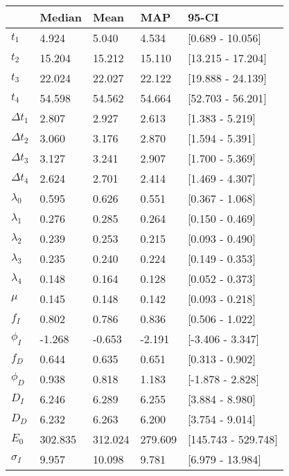 \begin{tabular}{lllll}
\toprule
{} &   Median &     Mean &      MAP &                95-CI \\
\midrule
$t_1$        &    4.924 &    5.040 &    4.534 &     [0.689 - 10.056] \\
$t_2$        &   15.204 &   15.212 &   15.110 &    [13.215 - 17.204] \\
$t_3$        &   22.024 &   22.027 &   22.122 &    [19.888 - 24.139] \\
$t_4$        &   54.598 &   54.562 &   54.664 &    [52.703 - 56.201] \\
$\Delta t_1$ &    2.807 &    2.927 &    2.613 &      [1.383 - 5.219] \\
$\Delta t_2$ &    3.060 &    3.176 &    2.870 &      [1.594 - 5.391] \\
$\Delta t_3$ &    3.127 &    3.241 &    2.907 &      [1.700 - 5.369] \\
$\Delta t_4$ &    2.624 &    2.701 &    2.414 &      [1.469 - 4.307] \\
$\lambda_0$  &    0.595 &    0.626 &    0.551 &      [0.367 - 1.068] \\
$\lambda_1$  &    0.276 &    0.285 &    0.264 &      [0.150 - 0.469] \\
$\lambda_2$  &    0.239 &    0.253 &    0.215 &      [0.093 - 0.490] \\
$\lambda_3$  &    0.235 &    0.240 &    0.224 &      [0.149 - 0.353] \\
$\lambda_4$  &    0.148 &    0.164 &    0.128 &      [0.052 - 0.373] \\
$\mu$        &    0.145 &    0.148 &    0.142 &      [0.093 - 0.218] \\
$f_I$        &    0.802 &    0.786 &    0.836 &      [0.506 - 1.022] \\
$\phi_I$     &   -1.268 &   -0.653 &   -2.191 &     [-3.406 - 3.347] \\
$f_D$        &    0.644 &    0.635 &    0.651 &      [0.313 - 0.902] \\
$\phi_D$     &    0.938 &    0.818 &    1.183 &     [-1.878 - 2.828] \\
$D_I$        &    6.246 &    6.289 &    6.255 &      [3.884 - 8.980] \\
$D_D$        &    6.232 &    6.263 &    6.200 &      [3.754 - 9.014] \\
$E_0$        &  302.835 &  312.024 &  279.609 &  [145.743 - 529.748] \\
$\sigma_I$   &    9.957 &   10.098 &    9.781 &     [6.979 - 13.984] \\

\end{tabular}
